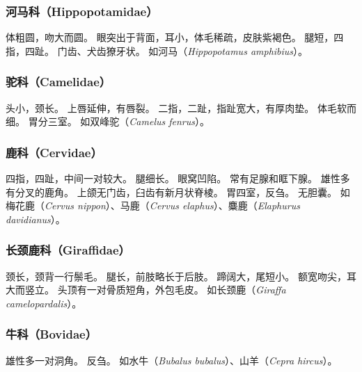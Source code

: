 \documentclass[11pt]{article}
\begin{document}
\subsubsection{河马科（Hippopotamidae）}
体粗圆，吻大而圆。
眼突出于背面，耳小，体毛稀疏，皮肤紫褐色。
腿短，四指，四趾。
门齿、犬齿獠牙状。
如河马（\textit{Hippopotamus amphibius}）。

\subsubsection{驼科（Camelidae）}
头小，颈长。
上唇延伸，有唇裂。
二指，二趾，指趾宽大，有厚肉垫。
体毛软而细。
胃分三室。
如双峰驼（\textit{Camelus fenrus}）。

\subsubsection{鹿科（Cervidae）}
四指，四趾，中间一对较大。
腿细长。
眼窝凹陷。
常有足腺和眶下腺。
雄性多有分叉的鹿角。
上颌无门齿，臼齿有新月状脊棱。
胃四室，反刍。
无胆囊。
如梅花鹿（\textit{Cervus nippon}）、马鹿（\textit{Cervus elaphus}）、麋鹿（\textit{Elaphurus davidianus}）。

\subsubsection{长颈鹿科（Giraffidae）}
颈长，颈背一行鬃毛。
腿长，前肢略长于后肢。
蹄阔大，尾短小。
额宽吻尖，耳大而竖立。
头顶有一对骨质短角，外包毛皮。
如长颈鹿（\textit{Giraffa camelopardalis}）。

\subsubsection{牛科（Bovidae）}
雄性多一对洞角。
反刍。
如水牛（\textit{Bubalus bubalus}）、山羊（\textit{Cepra hircus}）。
\end{document}
